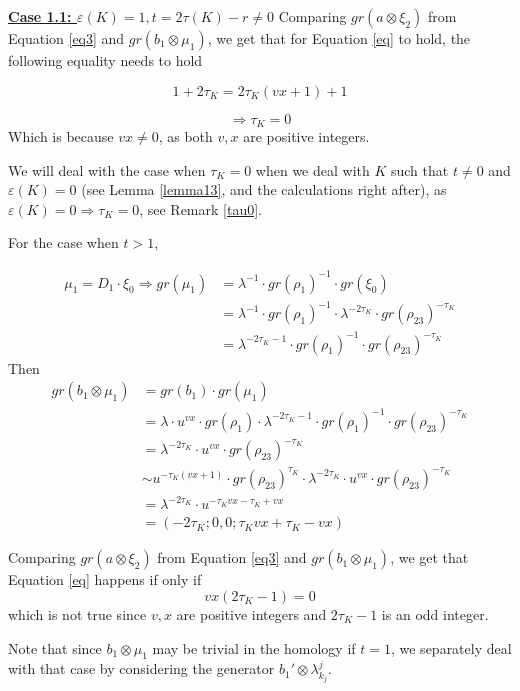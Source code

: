 \documentclass[11pt,reqno]{amsart}
\theoremstyle{definition}
\newtheorem *{remark}{Remark}
\begin{document}
\begin{subsection}{\underline{\textbf{Case 1.1: $\varepsilon(K)=1, t = 2 \tau(K) - r \neq 0$}}}
Comparing $ gr(a \otimes \xi_2)$ from Equation \ref{eq3} and $ gr(b_1 \otimes \mu_1)$, we get that for Equation \ref{eq} to hold, the following equality needs to hold 

\[1+2\tau_K = 2\tau_K(vx+1)+1\]

 \[\Rightarrow \tau_K = 0 \]
Which is because $vx \neq 0$, as both $v,x$ are positive integers.

We will deal with the case when $\tau_K = 0$ when we deal with $K$ such that $t \neq 0$ and $\varepsilon(K) = 0$ (see Lemma \ref{lemma13}, and the calculations right after), as $\varepsilon(K) = 0 \Rightarrow \tau_K = 0$, see Remark \ref{tau0}.


For the case when $t > 1$,


\begin{align*}
    \mu_1 = D_1 \cdot \xi_0 \Rightarrow gr(\mu_1) &= \lambda^{-1} \cdot gr(\rho_1)^{-1} \cdot gr(\xi_0) \\
    &= \lambda^{-1} \cdot gr(\rho_1)^{-1} \cdot \lambda^{-2\tau_K} \cdot gr(\rho_{23})^{-\tau_K} \\
    &= \lambda^{-2\tau_K - 1} \cdot gr(\rho_1)^{-1} \cdot gr(\rho_{23})^{-\tau_K}
    \end{align*}
Then
\begin{align*}
    gr(b_1 \otimes \mu_1) &= gr(b_1) \cdot gr(\mu_1) \\
    &= \lambda \cdot u^{vx} \cdot gr(\rho_1) \cdot  \lambda^{-2\tau_K - 1} \cdot gr(\rho_1)^{-1} \cdot gr(\rho_{23})^{-\tau_K}\\
    &= \lambda^{-2\tau_K} \cdot u^{vx} \cdot gr(\rho_{23})^{-\tau_K} \\
    & \sim u^{-\tau_K(vx+1)} \cdot gr(\rho_{23})^{\tau_K} \cdot \lambda^{-2\tau_K} \cdot u^{vx} \cdot gr(\rho_{23})^{-\tau_K}  \\
    &= \lambda^{-2\tau_K} \cdot u^{-\tau_Kvx - \tau_K + vx}\\
    &= (-2\tau_K; 0,0; \tau_Kvx + \tau_K - vx)
\end{align*}


Comparing $gr(a\otimes \xi_2)$ from Equation \ref{eq3} and $gr(b_1\otimes \mu_1)$, we get that Equation \ref{eq} happens if only if \[vx(2\tau_K - 1) =  0\] which is not true since $v,x$ are positive integers and $2\tau_K - 1$ is an odd integer.








Note that since $b_1\otimes \mu_1$ may be trivial in the homology if $t = 1$, we separately deal with that case by considering the generator $b_1' \otimes \lambda^j_{k_j}$.


\end{subsection}
\end{document}
